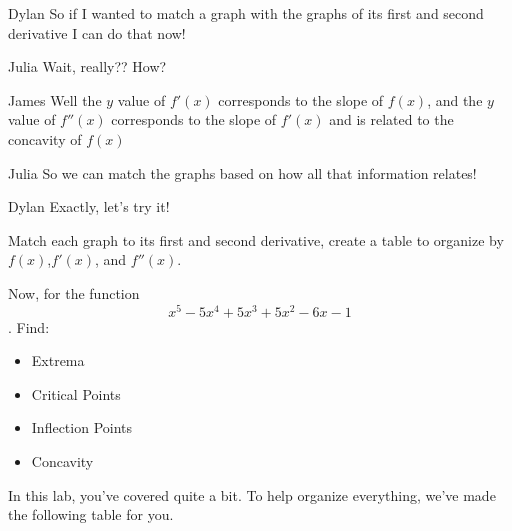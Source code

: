 \documentclass{ximera}
\begin{document}
\begin{dialogue}
\item[Dylan]So if I wanted to match a graph with the graphs of its first and second derivative I can do that now!
\item[Julia] Wait, really?? How?
\item[James] Well the $y$ value of $f'(x)$ corresponds to the slope of $f(x)$, and the $y$ value of $f''(x)$ corresponds to the slope of $f'(x)$ and is related to the concavity of $f(x)$
\item[Julia] So we can match the graphs based on how all that information relates!
\item[Dylan] Exactly, let's try it!
\end{dialogue}
Match each graph to its first and second derivative, create a table to organize by $f(x)$,$f'(x)$, and $f''(x)$.

Now, for the function $$x^5-5x^4+5x^3+5x^2-6x-1$$. Find:
\begin{itemize}
\item{Extrema}
\item{Critical Points}
\item{Inflection Points}
\item{Concavity}
\end{itemize}


In this lab, you've covered quite a bit. To help organize everything, we've made the following table for you.
\end{document}
